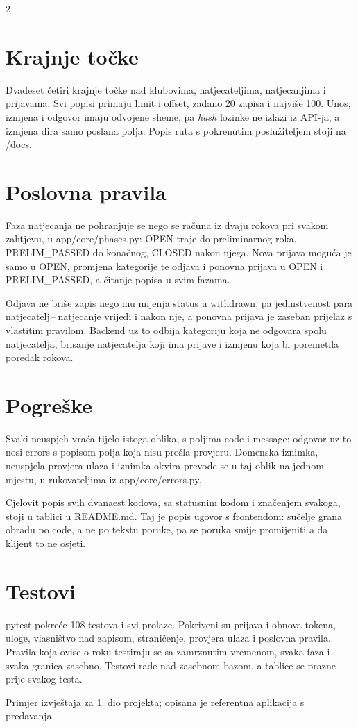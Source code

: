 \documentclass[10pt,a4paper]{article}
\newcommand{\code}[1]{{\ttfamily #1}}
\begin{document}
\begin{multicols}{2}
\section{Krajnje točke}

Dvadeset četiri krajnje točke nad klubovima, natjecateljima, natjecanjima i prijavama. Svi popisi primaju \code{limit} i \code{offset}, zadano 20 zapisa i najviše 100. Unos, izmjena i odgovor imaju odvojene sheme, pa \emph{hash} lozinke ne izlazi iz API-ja, a izmjena dira samo poslana polja. Popis ruta s pokrenutim poslužiteljem stoji na \code{/docs}.

\section{Poslovna pravila}

Faza natjecanja ne pohranjuje se nego se računa iz dvaju rokova pri svakom zahtjevu, u \code{app/core/phases.py}: \code{OPEN} traje do preliminarnog roka, \code{PRELIM\_PASSED} do konačnog, \code{CLOSED} nakon njega. Nova prijava moguća je samo u \code{OPEN}, promjena kategorije te odjava i ponovna prijava u \code{OPEN} i \code{PRELIM\_PASSED}, a čitanje popisa u svim fazama.

Odjava ne briše zapis nego mu mijenja \code{status} u \code{withdrawn}, pa jedinstvenost para natjecatelj\,--\,natjecanje vrijedi i nakon nje, a ponovna prijava je zaseban prijelaz s vlastitim pravilom. Backend uz to odbija kategoriju koja ne odgovara spolu natjecatelja, brisanje natjecatelja koji ima prijave i izmjenu koja bi poremetila poredak rokova.

\section{Pogreške}

Svaki neuspjeh vraća tijelo istoga oblika, s poljima \code{code} i \code{message}; odgovor \code{422} uz to nosi \code{errors} s popisom polja koja nisu prošla provjeru. Domenska iznimka, neuspjela provjera ulaza i iznimka okvira prevode se u taj oblik na jednom mjestu, u rukovateljima iz \code{app/core/errors.py}.

Cjelovit popis svih dvanaest kodova, sa statusnim kodom i značenjem svakoga, stoji u tablici u \code{README.md}. Taj je popis ugovor s frontendom: sučelje grana obradu po \code{code}, a ne po tekstu poruke, pa se poruka smije promijeniti a da klijent to ne osjeti.

\section{Testovi}

\code{pytest} pokreće 108 testova i svi prolaze. Pokriveni su prijava i obnova tokena, uloge, vlasništvo nad zapisom, straničenje, provjera ulaza i poslovna pravila. Pravila koja ovise o roku testiraju se sa zamrznutim vremenom, svaka faza i svaka granica zasebno. Testovi rade nad zasebnom bazom, a tablice se prazne prije svakog testa.

\end{multicols}

\vspace{0.5em}
{\color{muted}\small Primjer izvještaja za 1. dio projekta; opisana je referentna aplikacija s predavanja.\par}
\end{document}
